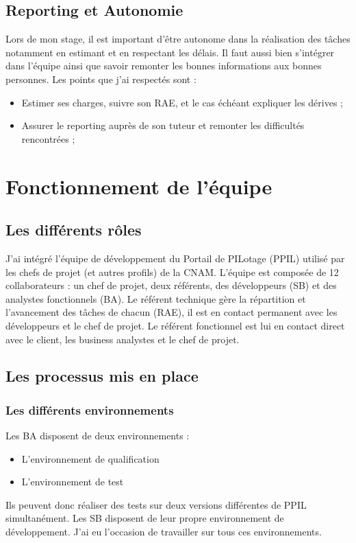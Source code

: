 \subsection{Reporting et Autonomie}

Lors de mon stage, il est important d'être autonome dans la réalisation des tâches notamment en estimant et en respectant les délais. Il faut aussi bien s'intégrer dans l'équipe ainsi que savoir remonter les bonnes informations aux bonnes personnes. Les points que j'ai respectés sont :
\begin{itemize}
    \item Estimer ses charges, suivre son RAE, et le cas échéant expliquer les dérives ;
    \item Assurer le reporting auprès de son tuteur et remonter les difficultés rencontrées ;
\end{itemize}

\section{Fonctionnement de l'équipe}

\subsection{Les différents rôles}

J'ai intégré l'équipe de développement du Portail de PILotage (PPIL) utilisé par les chefs de projet (et autres profils) de la CNAM. L'équipe est composée de 12 collaborateurs : un chef de projet, deux référents, des développeurs (SB) et des analystes fonctionnels (BA).
Le référent technique gère la répartition et l'avancement des tâches de chacun (RAE), il est en contact permanent avec les développeurs et le chef de projet. Le référent fonctionnel est lui en contact direct avec le client, les business analystes et le chef de projet.

\subsection{Les processus mis en place}
\subsubsection{Les différents environnements}
Les BA disposent de deux environnements :
\begin{itemize}
    \item L'environnement de qualification
    \item L'environnement de test
\end{itemize}
Ils peuvent donc réaliser des tests sur deux versions différentes de PPIL simultanément. Les SB disposent de leur propre environnement de développement. J'ai eu l'occasion de travailler sur tous ces environnements.
